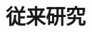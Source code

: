 \documentclass[submit,ses,noauthor]{ipsj}
\begin{document}
\begin{table}[t]
{\begin{tabular}{c|c|cccccccc}
\end{tabular}
}
 \vspace{-5mm}
\end{table}


\section{従来研究}\label{sec:relate}

\end{document}
